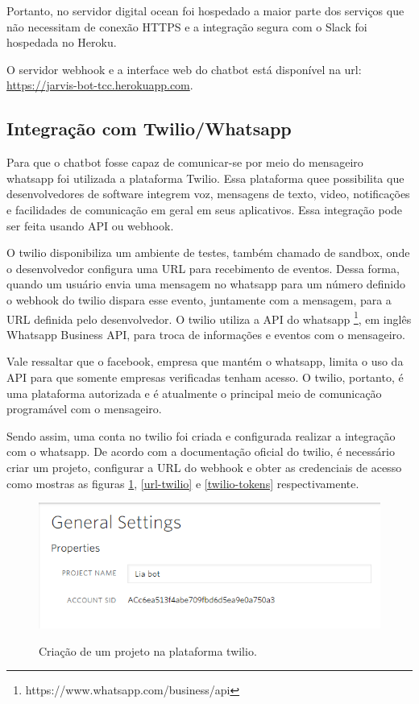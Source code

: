Portanto, no servidor digital ocean foi hospedado a maior parte dos serviços que não necessitam de conexão HTTPS e a integração segura com o Slack foi hospedada no Heroku.

O servidor webhook e a interface web do chatbot está disponível na url: \url{https://jarvis-bot-tcc.herokuapp.com}.



\subsection{Integração com Twilio/Whatsapp}

Para que o chatbot fosse capaz de comunicar-se por meio do mensageiro whatsapp foi utilizada a plataforma Twilio. Essa plataforma  quee possibilita que desenvolvedores de software integrem voz, mensagens de texto, video, notificações e facilidades de comunicação em  geral em seus aplicativos. Essa integração pode ser feita usando API ou webhook.

O twilio disponibiliza um ambiente de testes, também chamado de sandbox, onde o desenvolvedor configura uma URL para recebimento de eventos. Dessa forma, quando um usuário envia uma mensagem no whatsapp para um número definido o webhook do twilio dispara esse evento, juntamente com a mensagem, para a URL definida pelo desenvolvedor. O twilio utiliza a API do whatsapp \footnote{https://www.whatsapp.com/business/api}, em inglês Whatsapp Business API, para troca de informações e eventos com o mensageiro.

Vale ressaltar que o facebook, empresa que mantém o whatsapp, limita o uso da API para que somente empresas verificadas tenham acesso. O twilio, portanto, é uma plataforma autorizada e é atualmente o principal meio de comunicação programável com o mensageiro.

Sendo assim, uma conta no twilio foi criada e configurada realizar a integração com o whatsapp. De acordo com a documentação oficial do twilio, é necessário criar um projeto, configurar a URL do webhook e obter as credenciais de acesso como mostras as figuras \ref{twilio-project}, \ref{url-twilio} e \ref{twilio-tokens} respectivamente. 



\begin{figure}[H]
  \centering
   \caption{Criação de um projeto na plataforma twilio.}
  \includegraphics[scale=0.5]{Imagens/twilioproject.PNG} 
  \label{twilio-project}
\end{figure}


